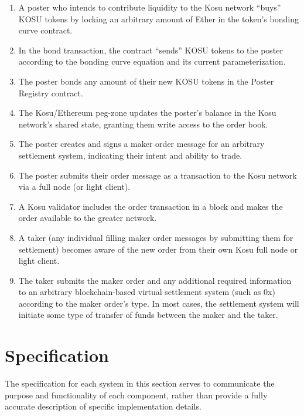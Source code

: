 \documentclass[10pt]{article}
\begin{document}
\begin{enumerate}[1.]
  \item A poster who intends to contribute liquidity to the Kosu network ``buys'' KOSU tokens by locking an arbitrary amount of Ether in the token's bonding curve contract.
  \item In the bond transaction, the contract ``sends'' KOSU tokens to the poster according to the bonding curve equation and its current parameterization.
  \item The poster bonds any amount of their new KOSU tokens in the Poster Registry contract.
  \item The Kosu/Ethereum peg-zone updates the poster's balance in the Kosu network's shared state, granting them write access to the order book.
  \item The poster creates and signs a maker order message for an arbitrary settlement system, indicating their intent and ability to trade.
  \item The poster submits their order message as a transaction to the Kosu network via a full node (or light client).
  \item A Kosu validator includes the order transaction in a block and makes the order available to the greater network.
  \item A taker (any individual filling maker order messages by submitting them for settlement) becomes aware of the new order from their own Kosu full node or light client.
  \item The taker submits the maker order and any additional required information to an arbitrary blockchain-based virtual settlement system (such as 0x) according to the maker order's type. In most cases, the settlement system will initiate some type of transfer of funds between the maker and the taker.
\end{enumerate}
\clearpage
\pagebreak


\section{Specification}\label{specification}
The specification for each system in this section serves to communicate the purpose and functionality of each component, rather than provide a fully accurate description of specific implementation details.
\medskip
\end{document}
